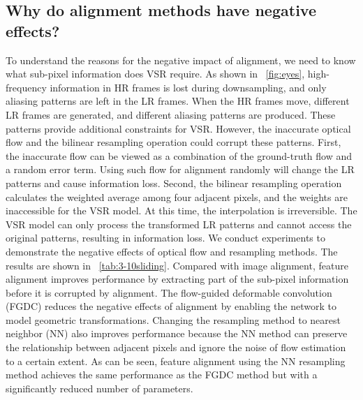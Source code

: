 \documentclass{article}
\begin{document}
\vspace{-2mm}
\subsection{Why do alignment methods have negative effects?}\label{sec:rethinking:why}
\vspace{-2mm}



To understand the reasons for the negative impact of alignment, we need to know what sub-pixel information does VSR require.
As shown in \figurename~\ref{fig:eyes}, high-frequency information in HR frames is lost during downsampling, and only aliasing patterns are left in the LR frames.
When the HR frames move, different LR frames are generated, and different aliasing patterns are produced.
These patterns provide additional constraints for VSR.
However, the inaccurate optical flow and the bilinear resampling operation could corrupt these patterns.
First, the inaccurate flow can be viewed as a combination of the ground-truth flow and a random error term.
Using such flow for alignment randomly will change the LR patterns and cause information loss.
Second, the bilinear resampling operation calculates the weighted average among four adjacent pixels, and the weights are inaccessible for the VSR model.
At this time, the interpolation is irreversible.
The VSR model can only process the transformed LR patterns and cannot access the original patterns, resulting in information loss.
We conduct experiments to demonstrate the negative effects of optical flow and resampling methods. The results are shown in \tablename~\ref{tab:3-10sliding}.
Compared with image alignment, feature alignment improves performance by extracting part of the sub-pixel information before it is corrupted by alignment.
The flow-guided deformable convolution (FGDC) reduces the negative effects of alignment by enabling the network to model geometric transformations.
Changing the resampling method to nearest neighbor (NN) also improves performance because the NN method can preserve the relationship between adjacent pixels and ignore the noise of flow estimation to a certain extent.
As can be seen, feature alignment using the NN resampling method achieves the same performance as the FGDC method but with a significantly reduced number of parameters.




\vspace{-3mm}
\end{document}

